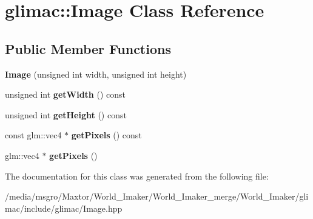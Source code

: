 \hypertarget{classglimac_1_1Image}{}\section{glimac\+:\+:Image Class Reference}
\label{classglimac_1_1Image}
\subsection*{Public Member Functions}
\begin{DoxyCompactItemize}
\item 
\mbox{\label{classglimac_1_1Image_a8d0769d9756924f57b740e48e9fb09f6}} 
{\bfseries Image} (unsigned int width, unsigned int height)
\item 
\mbox{\label{classglimac_1_1Image_a23bc966575ee67b85fc575631b035026}} 
unsigned int {\bfseries get\+Width} () const
\item 
\mbox{\label{classglimac_1_1Image_a0a2afce624e3df2b12d7d76ba0d31c42}} 
unsigned int {\bfseries get\+Height} () const
\item 
\mbox{\label{classglimac_1_1Image_af2cdd4b884831808f5ecba70209c2f95}} 
const glm\+::vec4 $\ast$ {\bfseries get\+Pixels} () const
\item 
\mbox{\label{classglimac_1_1Image_a679f8ae515ad9607faa762e1e2105285}} 
glm\+::vec4 $\ast$ {\bfseries get\+Pixels} ()
\end{DoxyCompactItemize}


The documentation for this class was generated from the following file\+:\begin{DoxyCompactItemize}
\item 
/media/msgro/\+Maxtor/\+World\+\_\+\+Imaker/\+World\+\_\+\+Imaker\+\_\+merge/\+World\+\_\+\+Imaker/glimac/include/glimac/Image.\+hpp\end{DoxyCompactItemize}
